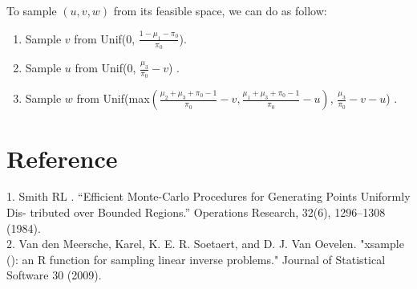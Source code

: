 \documentclass[11 pt, a4paper]{article}  %
\begin{document}
To sample $(u,v,w)$ from its feasible space, we can do as follow:
\begin{enumerate}
\item Sample $v$ from Unif($0$, $\frac{1-\mu_1-\pi_0}{\pi_0}$).
\item Sample $u$ from Unif($0$, $\frac{\mu_3}{\pi_0} - v$) .
\item Sample $w$ from Unif(max$(\frac{\mu_2 + \mu_3 + \pi_0 - 1}{\pi_0} -v,\frac{\mu_1 + \mu_3 + \pi_0 - 1}{\pi_0}-u )$, $\frac{\mu_3}{\pi_0} - v - u$) .
\end{enumerate}
 


%


\newpage
\section*{Reference}
1. Smith RL . “Efficient Monte-Carlo Procedures for Generating Points Uniformly Dis- tributed over Bounded Regions.” Operations Research, 32(6), 1296–1308 (1984).\\ 
2. Van den Meersche, Karel, K. E. R. Soetaert, and D. J. Van Oevelen. "xsample (): an R function for sampling linear inverse problems." Journal of Statistical Software 30 (2009).
\end{document}
